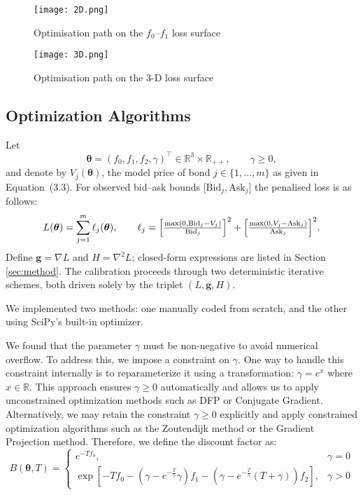 \documentclass[12pt]{article}
\begin{document}
\begin{figure}[ht]
  \centering
  \begin{minipage}[t]{0.48\linewidth}
    \centering
    \texttt{[image: 2D.png]}
    \caption{Optimisation path on the $f_0$–$f_1$ loss surface}
    \label{fig:path-2d}
  \end{minipage}
  \hspace{0.02\linewidth}
  \begin{minipage}[t]{0.48\linewidth}
    \centering
    \texttt{[image: 3D.png]}
    \caption{Optimisation path on the 3-D loss surface}
    \label{fig:path-3d}
  \end{minipage}
\end{figure}



\subsection{Optimization Algorithms}

Let
\[
\boldsymbol{\theta}
=(f_{0},f_{1},f_{2},\gamma)^{\top}\in\mathbb{R}^{3}\times\mathbb{R}_{++},
\qquad
\gamma\geq0,
\]
and denote by \(V_{j}(\boldsymbol{\theta})\), the model price of bond \(j\in\{1,\dots,m\}\) as given in Equation~(3.3).
For observed bid–ask bounds \(\bigl[\text{Bid}_{j},\text{Ask}_{j}\bigr]\)
the penalised loss is as follows:
\[
L(\boldsymbol{\theta})
=\sum_{j=1}^{m}\ell_{j}(\boldsymbol{\theta}),\qquad
\ell_{j}
=\Bigl[\tfrac{\max(0,\text{Bid}_{j}-V_{j})}{\text{Bid}_{j}}\Bigr]^{2}
     +
     \Bigl[\tfrac{\max(0,V_{j}-\text{Ask}_{j})}{\text{Ask}_{j}}\Bigr]^{2}.
\]
Define \(\boldsymbol{g}=\nabla L\) and \(H=\nabla^{2}L\); closed-form expressions are listed in Section \ref{sec:method}. The calibration proceeds through two deterministic iterative schemes,
both driven solely by the triplet \((L,\boldsymbol{g},H)\).

We implemented two methods: one manually coded from scratch, and the other using SciPy’s built-in optimizer. 

We found that the parameter $\gamma$ must be non-negative to avoid numerical overflow. To address this, we impose a constraint on $\gamma$. One way to handle this constraint internally is to reparameterize it using a transformation: $\gamma=e^x$ where $x \in \mathbb{R}$. This approach ensures $\gamma\geq0$ automatically and allows us to apply unconstrained optimization methods such as DFP or Conjugate Gradient. 
 Alternatively, we may retain the constraint $\gamma\geq0$ explicitly and apply constrained optimization algorithms such as the Zoutendijk method or the Gradient Projection method.
Therefore, we define the discount factor as:
$$B(\boldsymbol{\theta}, T) = \begin{cases}
    e^{-Tf_0}, & \gamma = 0\\
 \exp\left[
- T f_0
- \left( \gamma - e^{- \frac{T}{\gamma}} \gamma \right) f_1
- \left( \gamma - e^{- \frac{T}{\gamma}} (T + \gamma) \right) f_2
\right], &\gamma > 0
\end{cases}$$
\end{document}
